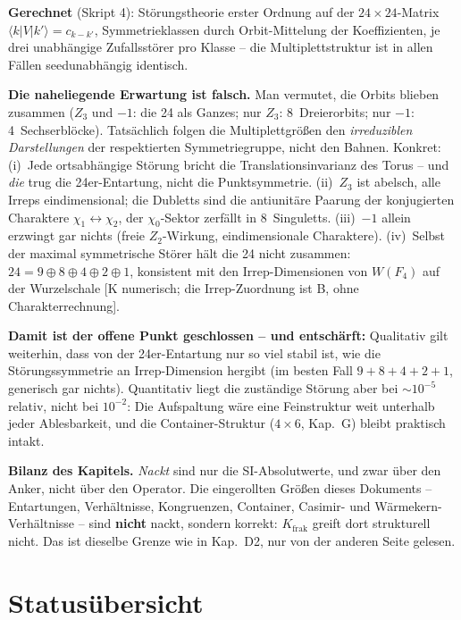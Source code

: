 \textbf{Gerechnet} (Skript 4): Störungstheorie erster Ordnung auf
der $24\times24$-Matrix $\langle k|V|k'\rangle = c_{k-k'}$,
Symmetrieklassen durch Orbit-Mittelung der Koeffizienten, je drei
unabhängige Zufallsstörer pro Klasse -- die Multiplettstruktur ist
in allen Fällen seedunabhängig identisch.

\textbf{Die naheliegende Erwartung ist falsch.} Man vermutet, die
Orbits blieben zusammen ($Z_3$ und $-1$: die 24 als Ganzes; nur
$Z_3$: 8~Dreierorbits; nur $-1$: 4~Sechserblöcke). Tatsächlich
folgen die Multiplettgrößen den \emph{irreduziblen Darstellungen}
der respektierten Symmetriegruppe, nicht den Bahnen. Konkret: (i)~Jede ortsabhängige Störung bricht die
Translationsinvarianz des Torus -- und \emph{die} trug die
24er-Entartung, nicht die Punktsymmetrie. (ii)~$Z_3$ ist abelsch,
alle Irreps eindimensional; die Dubletts sind die antiunitäre
Paarung der konjugierten Charaktere $\chi_1\leftrightarrow\chi_2$,
der $\chi_0$-Sektor zerfällt in 8~Singuletts. (iii)~$-1$ allein
erzwingt gar nichts (freie $Z_2$-Wirkung, eindimensionale
Charaktere). (iv)~Selbst der maximal symmetrische Störer hält die
24 nicht zusammen: $24 = 9\oplus8\oplus4\oplus2\oplus1$,
konsistent mit den Irrep-Dimensionen von $W(F_4)$ auf der
Wurzelschale [K numerisch; die Irrep-Zuordnung ist B, ohne
Charakterrechnung].

\textbf{Damit ist der offene Punkt geschlossen -- und entschärft:}
Qualitativ gilt weiterhin, dass von der 24er-Entartung nur so viel
stabil ist, wie die Störungssymmetrie an Irrep-Dimension hergibt
(im besten Fall $9+8+4+2+1$, generisch gar nichts). Quantitativ
liegt die zuständige Störung aber bei $\sim10^{-5}$ relativ, nicht
bei $10^{-2}$: Die Aufspaltung wäre eine Feinstruktur weit
unterhalb jeder Ablesbarkeit, und die Container-Struktur
($4\times6$, Kap.~G) bleibt praktisch intakt.

\textbf{Bilanz des Kapitels.} \emph{Nackt} sind nur die
SI-Absolutwerte, und zwar über den Anker, nicht über den
Operator. Die eingerollten Größen dieses Dokuments --
Entartungen, Verhältnisse, Kongruenzen, Container, Casimir- und
Wärmekern-Verhältnisse -- sind \textbf{nicht} nackt, sondern
korrekt: $K_\text{frak}$ greift dort strukturell nicht.
Das ist dieselbe Grenze wie in Kap.~D2, nur von der anderen
Seite gelesen.

\chapter{Statusübersicht}

